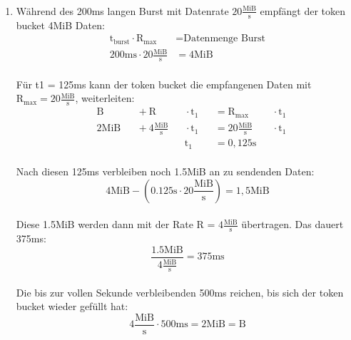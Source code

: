 \documentclass[a4paper,
			llpt,
			solution,
			accentcolor=tud2d,
			colorbacktitle
			]
			{tudexercise}
\newcommand{\MiBs}{\frac{\mathrm{MiB}}{\mathrm{s}}}
\begin{document}
\subsubsection{}
\begin{enumerate}

\item
\begin{multicols}{2}
Während des 200ms langen Burst mit Datenrate $20\MiBs$ empfängt der token bucket 4MiB Daten: 
\begin{align*}
\text{t}_\text{burst}  \cdot \text{R}_\text{max} &= \text{Datenmenge Burst}
\\
200\mathrm{ms} \cdot 20\MiBs &= \mathrm{4MiB}
\end{align*}\\
Für t1 = 125ms kann der token bucket die empfangenen Daten mit $\mathrm{R}_{\mathrm{max}} = 20\MiBs$, weiterleiten:
\begin{alignat*}{5}
&\mathrm{B}     &&{}+ \mathrm{R} &&{}\cdot  \mathrm{t}_1 &&{}= \mathrm{R}_{\mathrm{max}} &&{}\cdot  \mathrm{t}_1 \\ 
& 2\mathrm{MiB} &&{}+ 4\MiBs &&{}\cdot   \mathrm{t}_1 &&{}= 20\MiBs &&{}\cdot  \mathrm{t}_1\\
&               &&{}         &&{}      \mathrm{t}_1 &&{}= 0,125\mathrm{s} &&{}
\end{alignat*}\\
Nach diesen 125ms verbleiben noch 1.5MiB an zu sendenden Daten:
$$4\mathrm{MiB} - \left(0.125\mathrm{s} \cdot 20\MiBs\right) = 1,5 \mathrm{MiB}$$\\
Diese 1.5MiB werden dann mit der Rate R = $4\MiBs
$
übertragen. Das dauert 375ms:
$$
\frac{1.5 \mathrm{MiB}}{ 4 \MiBs} = 375\mathrm{ms}
$$\\
Die bis zur vollen Sekunde verbleibenden 500ms reichen, bis sich der token bucket wieder gefüllt hat: 
$$
4\MiBs \cdot 500\mathrm{ms} = 2\mathrm{MiB} = \mathrm{B}
$$
\vfill
\columnbreak


\end{multicols}
\end{enumerate}
\end{document}
